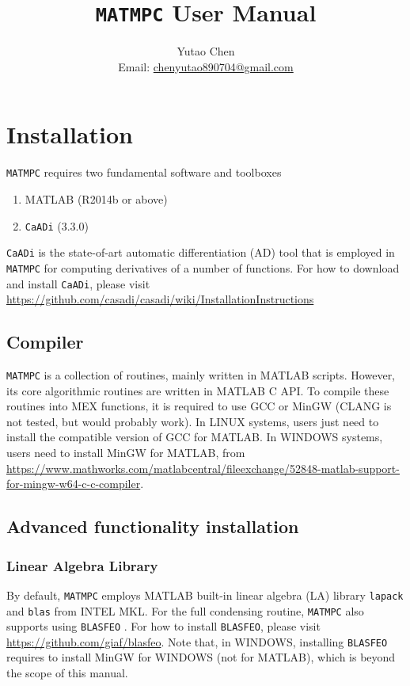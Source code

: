 \documentclass{article}
\newcommand{\software}[1]{{\tt#1}}
\begin{document}
	\title{\software{MATMPC} User Manual}
	\author{Yutao Chen\\ Email: \href{mailto:chenyutao890704@gmail.com}{chenyutao890704@gmail.com}}
	
	\maketitle
	
	\tableofcontents
	
	\newpage
	
\section{Installation}
\software{MATMPC} requires two fundamental software and toolboxes
\begin{enumerate}
	\item MATLAB (R2014b or above) 
	\item \software{CaADi} (3.3.0)
\end{enumerate}
\software{CaADi} is the state-of-art automatic differentiation (AD) tool \cite{andersson2018casadi} that is employed in \software{MATMPC} for computing derivatives of a number of functions. For how to download and install \software{CaADi}, please visit \url{https://github.com/casadi/casadi/wiki/InstallationInstructions}

\subsection{Compiler}
\software{MATMPC} is a collection of routines, mainly written in MATLAB scripts. However, its core algorithmic routines are written in MATLAB C API. To compile these routines into MEX functions, it is required to use GCC or MinGW (CLANG is not tested, but would probably work). In LINUX systems, users just need to install the compatible version of GCC for MATLAB. In WINDOWS systems, users need to install MinGW for MATLAB, from \url{https://www.mathworks.com/matlabcentral/fileexchange/52848-matlab-support-for-mingw-w64-c-c-compiler}.

\subsection{Advanced functionality installation}

\subsubsection{Linear Algebra Library}
By default, \software{MATMPC} employs MATLAB built-in linear algebra (LA) library \software{lapack} and \software{blas} from INTEL MKL. For the full condensing routine, \software{MATMPC} also supports using \software{BLASFEO} \cite{frison2018blasfeo}. For how to install \software{BLASFEO}, please visit \url{https://github.com/giaf/blasfeo}. Note that, in WINDOWS, installing \software{BLASFEO} requires to install MinGW for WINDOWS (not for MATLAB), which is beyond the scope of this manual.
\end{document}
